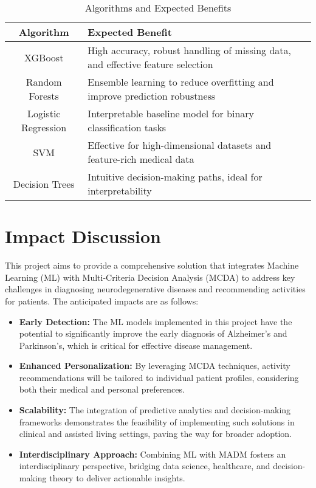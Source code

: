 \documentclass[conference]{IEEEtran}
\begin{document}
\begin{table}[htbp]
\caption{Algorithms and Expected Benefits}
\begin{center}
\begin{tabular}{|c|p{6cm}|}
\hline
\textbf{Algorithm} & \textbf{Expected Benefit} \\
\hline
XGBoost & High accuracy, robust handling of missing data, and effective feature selection \\
\hline
Random Forests & Ensemble learning to reduce overfitting and improve prediction robustness \\
\hline
Logistic Regression & Interpretable baseline model for binary classification tasks \\
\hline
SVM & Effective for high-dimensional datasets and feature-rich medical data \\
\hline
Decision Trees & Intuitive decision-making paths, ideal for interpretability \\
\hline
\end{tabular}
\label{tab1}
\end{center}
\end{table}

\section{Impact Discussion}
This project aims to provide a comprehensive solution that integrates Machine Learning (ML) with Multi-Criteria Decision Analysis (MCDA) to address key challenges in diagnosing neurodegenerative diseases and recommending activities for patients. The anticipated impacts are as follows:

\begin{itemize}
    \item \textbf{Early Detection:} The ML models implemented in this project have the potential to significantly improve the early diagnosis of Alzheimer’s and Parkinson’s, which is critical for effective disease management.
    \item \textbf{Enhanced Personalization:} By leveraging MCDA techniques, activity recommendations will be tailored to individual patient profiles, considering both their medical and personal preferences.
    \item \textbf{Scalability:} The integration of predictive analytics and decision-making frameworks demonstrates the feasibility of implementing such solutions in clinical and assisted living settings, paving the way for broader adoption.
    \item \textbf{Interdisciplinary Approach:} Combining ML with MADM fosters an interdisciplinary perspective, bridging data science, healthcare, and decision-making theory to deliver actionable insights.
\end{itemize}
\end{document}
